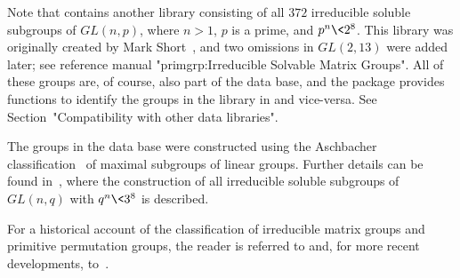 Note that {\GAP} contains another library consisting of all $372$ irreducible soluble
subgroups of $GL(n, p)$, where $n > 1$, $p$ is a prime, and $p^n \< 2^8$. This library 
was originally
created by Mark Short~\cite{Sho}, and two omissions in $GL(2,13)$ were added later; 
see {\PrimGrp} reference manual "primgrp:Irreducible Solvable Matrix Groups".
All of these groups are,  of course, also part of the {\IRREDSOL} data base, and the
{\IRREDSOL} package provides functions to identify the groups in the
{\GAP} library in {\IRREDSOL} and vice-versa. See
Section~"Compatibility with other data libraries".

The groups in the {\IRREDSOL} data base were constructed using the Aschbacher 
classification~\cite{Asc} of maximal subgroups of linear groups. Further details can be found 
in~\cite{EH}, where the 
construction of all irreducible soluble subgroups of $GL(n, q)$ with $q^n \< 3^8$
is described.

For a historical account of the classification of irreducible matrix groups and
primitive permutation groups, the reader is referred to \cite{Sho} and, 
for more recent developments, to~\cite{EH}.


